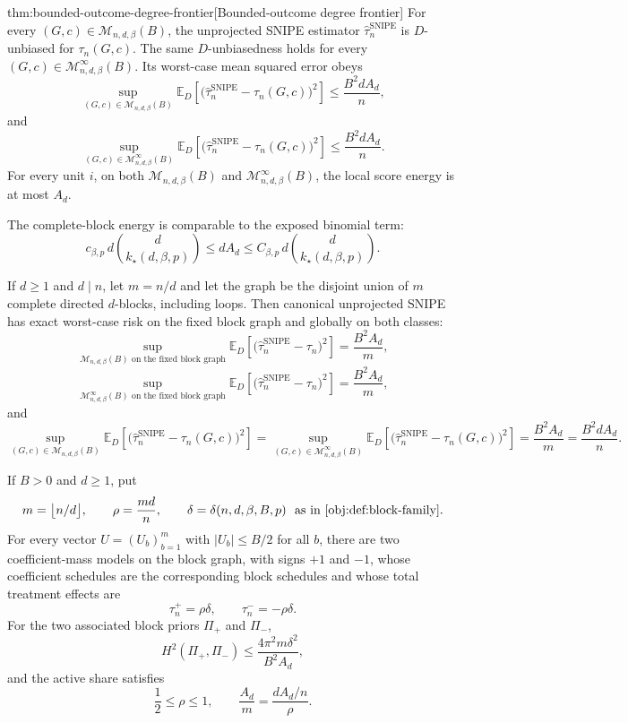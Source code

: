 \documentclass[11pt]{article}
\begin{document}
\begin{theoremv}{thm:bounded-outcome-degree-frontier}[Bounded-outcome degree frontier]
For every \((G,c)\in\mathcal M_{n,d,\beta}(B)\), the unprojected SNIPE estimator \(\widehat\tau_n^{\mathrm{SNIPE}}\) is \(D\)-unbiased for \(\tau_n(G,c)\).  The same \(D\)-unbiasedness holds for every \((G,c)\in\mathcal M_{n,d,\beta}^{\infty}(B)\).  Its worst-case mean squared error obeys
\[
\sup_{(G,c)\in\mathcal M_{n,d,\beta}(B)}
\mathbb E_D\!\left[
\bigl(\widehat\tau_n^{\mathrm{SNIPE}}-\tau_n(G,c)\bigr)^2
\right]
\le
\frac{B^2 d A_d}{n},
\]
and
\[
\sup_{(G,c)\in\mathcal M_{n,d,\beta}^{\infty}(B)}
\mathbb E_D\!\left[
\bigl(\widehat\tau_n^{\mathrm{SNIPE}}-\tau_n(G,c)\bigr)^2
\right]
\le
\frac{B^2 d A_d}{n}.
\]
For every unit \(i\), on both \(\mathcal M_{n,d,\beta}(B)\) and \(\mathcal M_{n,d,\beta}^{\infty}(B)\), the local score energy is at most \(A_d\).

The complete-block energy is comparable to the exposed binomial term:
\[
c_{\beta,p}\, d\binom{d}{k_\star(d,\beta,p)}
\le
dA_d
\le
C_{\beta,p}\, d\binom{d}{k_\star(d,\beta,p)}.
\]

If \(d\ge1\) and \(d\mid n\), let \(m=n/d\) and let the graph be the disjoint union of \(m\) complete directed \(d\)-blocks, including loops.  Then canonical unprojected SNIPE has exact worst-case risk on the fixed block graph and globally on both classes:
\[
\sup_{\mathcal M_{n,d,\beta}(B)\text{ on the fixed block graph}}
\mathbb E_D\!\left[
\bigl(\widehat\tau_n^{\mathrm{SNIPE}}-\tau_n\bigr)^2
\right]
=
\frac{B^2A_d}{m},
\]
\[
\sup_{\mathcal M_{n,d,\beta}^{\infty}(B)\text{ on the fixed block graph}}
\mathbb E_D\!\left[
\bigl(\widehat\tau_n^{\mathrm{SNIPE}}-\tau_n\bigr)^2
\right]
=
\frac{B^2A_d}{m},
\]
and
\[
\sup_{(G,c)\in\mathcal M_{n,d,\beta}(B)}
\mathbb E_D\!\left[
\bigl(\widehat\tau_n^{\mathrm{SNIPE}}-\tau_n(G,c)\bigr)^2
\right]
=
\sup_{(G,c)\in\mathcal M_{n,d,\beta}^{\infty}(B)}
\mathbb E_D\!\left[
\bigl(\widehat\tau_n^{\mathrm{SNIPE}}-\tau_n(G,c)\bigr)^2
\right]
=
\frac{B^2A_d}{m}
=
\frac{B^2dA_d}{n}.
\]

If \(B>0\) and \(d\ge1\), put
\[
m=\bigl\lfloor n/d\bigr\rfloor,
\qquad
\rho=\frac{md}{n},
\qquad
\delta=\delta(n,d,\beta,B,p)\ \text{ as in \cref{obj:def:block-family}}.
\]
For every vector \(U=(U_b)_{b=1}^m\) with \(|U_b|\le B/2\) for all \(b\), there are two coefficient-mass models on the block graph, with signs \(+1\) and \(-1\), whose coefficient schedules are the corresponding block schedules and whose total treatment effects are
\[
\tau_n^{+}=\rho\delta,
\qquad
\tau_n^{-}=-\rho\delta.
\]
For the two associated block priors \(\Pi_+\) and \(\Pi_-\),
\[
H^2(\Pi_+,\Pi_-)
\le
\frac{4\pi^2 m\delta^2}{B^2A_d},
\]
and the active share satisfies
\[
\frac12\le \rho\le 1,
\qquad
\frac{A_d}{m}
=
\frac{dA_d/n}{\rho}.
\]
\end{theoremv}
\end{document}
